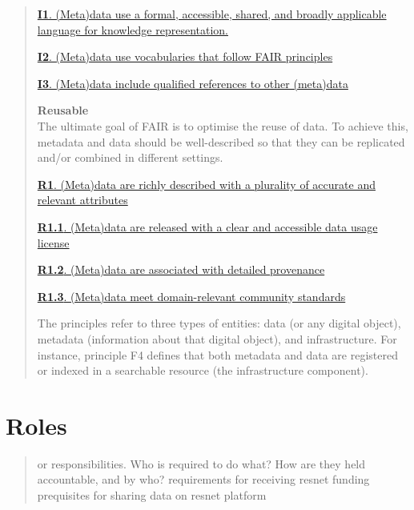 \documentclass[
]{book}
\begin{document}
\begin{quote}
\href{https://www.go-fair.org/fair-principles/i1-metadata-use-formal-accessible-shared-broadly-applicable-language-knowledge-representation/}{\textbf{I1}. (Meta)data use a formal, accessible, shared, and broadly applicable language for knowledge representation.}

\href{https://www.go-fair.org/fair-principles/i2-metadata-use-vocabularies-follow-fair-principles/}{\textbf{I2}. (Meta)data use vocabularies that follow FAIR principles}

\href{https://www.go-fair.org/fair-principles/i3-metadata-include-qualified-references-metadata/}{\textbf{I3}. (Meta)data include qualified references to other (meta)data}

\textbf{Reusable}\\
The ultimate goal of FAIR is to optimise the reuse of data. To achieve this, metadata and data should be well-described so that they can be replicated and/or combined in different settings.

\href{https://www.go-fair.org/fair-principles/r1-metadata-richly-described-plurality-accurate-relevant-attributes/}{\textbf{R1}. (Meta)data are richly described with a plurality of accurate and relevant attributes}

\href{https://www.go-fair.org/fair-principles/r1-1-metadata-released-clear-accessible-data-usage-license/}{\textbf{R1.1}. (Meta)data are released with a clear and accessible data usage license}

\href{https://www.go-fair.org/fair-principles/r1-2-metadata-associated-detailed-provenance/}{\textbf{R1.2}. (Meta)data are associated with detailed provenance}

\href{https://www.go-fair.org/fair-principles/r1-3-metadata-meet-domain-relevant-community-standards/}{\textbf{R1.3}. (Meta)data meet domain-relevant community standards}

The principles refer to three types of entities: data (or any digital object), metadata (information about that digital object), and infrastructure. For instance, principle F4 defines that both metadata and data are registered or indexed in a searchable resource (the infrastructure component).
\end{quote}

\hypertarget{roles}{%
\section{Roles}\label{roles}}

\begin{quote}
or responsibilities. Who is required to do what? How are they held accountable, and by who? requirements for receiving resnet funding prequisites for sharing data on resnet platform
\end{quote}
\end{document}
